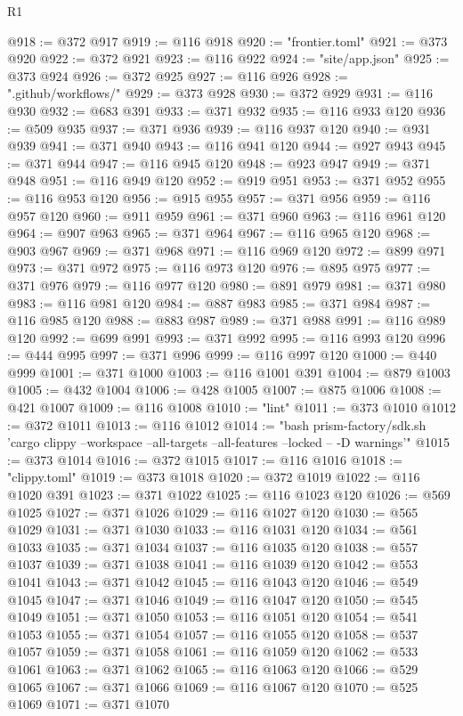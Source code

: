 \begin{lexlean}{R1}
\begin{coremodule}
@918 := @372 @917
@919 := @116 @918
@920 := "frontier.toml"
@921 := @373 @920
@922 := @372 @921
@923 := @116 @922
@924 := "site/app.json"
@925 := @373 @924
@926 := @372 @925
@927 := @116 @926
@928 := ".github/workflows/"
@929 := @373 @928
@930 := @372 @929
@931 := @116 @930
@932 := @683 @391
@933 := @371 @932
@935 := @116 @933 @120
@936 := @509 @935
@937 := @371 @936
@939 := @116 @937 @120
@940 := @931 @939
@941 := @371 @940
@943 := @116 @941 @120
@944 := @927 @943
@945 := @371 @944
@947 := @116 @945 @120
@948 := @923 @947
@949 := @371 @948
@951 := @116 @949 @120
@952 := @919 @951
@953 := @371 @952
@955 := @116 @953 @120
@956 := @915 @955
@957 := @371 @956
@959 := @116 @957 @120
@960 := @911 @959
@961 := @371 @960
@963 := @116 @961 @120
@964 := @907 @963
@965 := @371 @964
@967 := @116 @965 @120
@968 := @903 @967
@969 := @371 @968
@971 := @116 @969 @120
@972 := @899 @971
@973 := @371 @972
@975 := @116 @973 @120
@976 := @895 @975
@977 := @371 @976
@979 := @116 @977 @120
@980 := @891 @979
@981 := @371 @980
@983 := @116 @981 @120
@984 := @887 @983
@985 := @371 @984
@987 := @116 @985 @120
@988 := @883 @987
@989 := @371 @988
@991 := @116 @989 @120
@992 := @699 @991
@993 := @371 @992
@995 := @116 @993 @120
@996 := @444 @995
@997 := @371 @996
@999 := @116 @997 @120
@1000 := @440 @999
@1001 := @371 @1000
@1003 := @116 @1001 @391
@1004 := @879 @1003
@1005 := @432 @1004
@1006 := @428 @1005
@1007 := @875 @1006
@1008 := @421 @1007
@1009 := @116 @1008
@1010 := "lint"
@1011 := @373 @1010
@1012 := @372 @1011
@1013 := @116 @1012
@1014 := "bash prism-factory/sdk.sh 'cargo clippy --workspace --all-targets --all-features --locked -- -D warnings'"
@1015 := @373 @1014
@1016 := @372 @1015
@1017 := @116 @1016
@1018 := "clippy.toml"
@1019 := @373 @1018
@1020 := @372 @1019
@1022 := @116 @1020 @391
@1023 := @371 @1022
@1025 := @116 @1023 @120
@1026 := @569 @1025
@1027 := @371 @1026
@1029 := @116 @1027 @120
@1030 := @565 @1029
@1031 := @371 @1030
@1033 := @116 @1031 @120
@1034 := @561 @1033
@1035 := @371 @1034
@1037 := @116 @1035 @120
@1038 := @557 @1037
@1039 := @371 @1038
@1041 := @116 @1039 @120
@1042 := @553 @1041
@1043 := @371 @1042
@1045 := @116 @1043 @120
@1046 := @549 @1045
@1047 := @371 @1046
@1049 := @116 @1047 @120
@1050 := @545 @1049
@1051 := @371 @1050
@1053 := @116 @1051 @120
@1054 := @541 @1053
@1055 := @371 @1054
@1057 := @116 @1055 @120
@1058 := @537 @1057
@1059 := @371 @1058
@1061 := @116 @1059 @120
@1062 := @533 @1061
@1063 := @371 @1062
@1065 := @116 @1063 @120
@1066 := @529 @1065
@1067 := @371 @1066
@1069 := @116 @1067 @120
@1070 := @525 @1069
@1071 := @371 @1070

\end{coremodule}
\end{lexlean}
